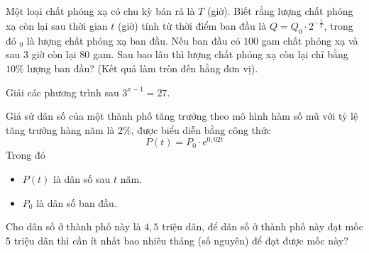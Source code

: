 \begin{ex}%
	Một loại chất phóng xạ có chu kỳ bán rã là $T$ (giờ). Biết rằng lượng chất phóng xạ còn lại sau thời gian $t$ (giờ) tính từ thời điểm ban đầu là $Q=Q_0\cdot 2^{-\tfrac{t}{T}}$, trong đó $_0$ là lượng chất phóng xạ ban đầu. Nếu ban đầu có $100$ gam chất phóng xạ và sau $3$ giờ còn lại $80$ gam. Sau bao lâu thì lượng chất phóng xạ còn lại chỉ bằng $10\%$ lượng ban đầu? (Kết quả làm tròn đến hằng đơn vị).
\end{ex}

\begin{ex}%
	Giải các phương trình sau $3^{x-1}=27$.
\end{ex}

\begin{ex}%
	Giả sử dân số của một thành phố tăng trưởng theo mô hình hàm số mũ với tỷ lệ tăng trưởng hàng năm là $2\%$, được biểu diễn bằng công thức
	$$P(t)=P_0\cdot \mathrm{e}^{0{,}02t}$$
	Trong đó
	\begin{itemize}
		\item $P(t)$ là dân số sau $t$ năm.
		\item $P_0$ là dân số ban đầu.
	\end{itemize}
	Cho dân số ở thành phố này là $4{,}5$ triệu dân, để dân số ở thành phố này đạt mốc $5$ triệu dân thì cần ít nhất bao nhiêu tháng (số nguyên) để đạt được mốc này?
\end{ex}

